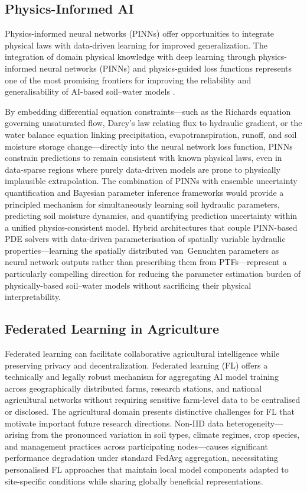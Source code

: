 \documentclass[land,article,submit,pdftex,moreauthors]{Definitions/mdpi}
\numberwithin{equation}{section}
\begin{document}
\subsection{Physics-Informed AI}

Physics-informed neural networks (PINNs) offer opportunities to integrate physical laws with data-driven learning for improved generalization. The integration of domain physical knowledge with deep learning through physics-informed neural networks (PINNs) and physics-guided loss functions represents one of the most promising frontiers for improving the reliability and generalisability of AI-based soil--water models \citep{karniadakis2021physics}. 

By embedding differential equation constraints---such as the Richards equation governing unsaturated flow, Darcy's law relating flux to hydraulic gradient, or the water balance equation linking precipitation, evapotranspiration, runoff, and soil moisture storage change---directly into the neural network loss function, PINNs constrain predictions to remain consistent with known physical laws, even in data-sparse regions where purely data-driven models are prone to physically implausible extrapolation.  The combination of PINNs with ensemble uncertainty quantification and Bayesian parameter inference frameworks would provide a principled mechanism for simultaneously learning soil hydraulic parameters, predicting soil moisture dynamics, and quantifying prediction uncertainty within a unified physics-consistent model. Hybrid architectures that couple PINN-based PDE solvers with data-driven parameterisation of spatially variable hydraulic properties---learning the spatially distributed van~Genuchten parameters as neural network outputs rather than prescribing them from PTFs---represent a particularly compelling direction for reducing the parameter estimation burden of physically-based soil--water models without sacrificing their physical interpretability.

\subsection{Federated Learning in Agriculture}

Federated learning can facilitate collaborative agricultural intelligence while preserving privacy and decentralization. Federated learning (FL) offers a technically and legally robust mechanism for aggregating AI model training across geographically distributed farms, research stations, and national agricultural networks without requiring sensitive farm-level data to be centralised or disclosed. The agricultural domain presents distinctive challenges for FL that motivate important future research directions. Non-IID data heterogeneity---arising from the pronounced variation in soil types, climate regimes, crop species, and management practices across participating nodes---causes significant performance degradation under standard FedAvg aggregation, necessitating personalised FL approaches that maintain local model components adapted to site-specific conditions while sharing globally beneficial representations. 
\end{document}

